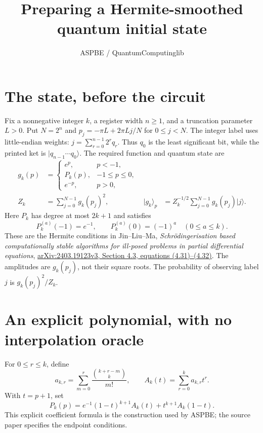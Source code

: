 \documentclass[11pt]{article}
\title{Preparing a Hermite-smoothed quantum initial state}
\author{ASPBE / QuantumComputinglib}
\date{}
\newcommand{\ket}[1]{\lvert #1\rangle}
\begin{document}
\maketitle

\section{The state, before the circuit}
Fix a nonnegative integer $k$, a register width $n\geq1$, and a truncation
parameter $L>0$. Put $N=2^n$ and $p_j=-\pi L+2\pi Lj/N$ for $0\leq j<N$.
The integer label uses little-endian weights:
$j=\sum_{r=0}^{n-1}2^rq_r$. Thus $q_0$ is the least significant bit,
while the printed ket is $\ket{q_{n-1}\cdots q_0}$.
The required function and quantum state are
\begin{align*}
g_k(p)&=\begin{cases}
 e^p,&p<-1,\\
 P_k(p),&-1\leq p\leq0,\\
 e^{-p},&p>0,
\end{cases}\\
Z_k&=\sum_{j=0}^{N-1}g_k(p_j)^2,
&\ket{g_k}_p&=Z_k^{-1/2}\sum_{j=0}^{N-1}g_k(p_j)\ket j.
\end{align*}
Here $P_k$ has degree at most $2k+1$ and satisfies
\[
P_k^{(a)}(-1)=e^{-1},\qquad P_k^{(a)}(0)=(-1)^a
\quad(0\leq a\leq k).
\]
These are the Hermite conditions in Jin--Liu--Ma,
\emph{Schr\"odingerisation based computationally stable algorithms for
ill-posed problems in partial differential equations},
\href{https://arxiv.org/html/2403.19123v3#S4.SS3}{arXiv:2403.19123v3,
Section 4.3, equations (4.31)--(4.32)}.
The amplitudes are $g_k(p_j)$, not their square roots. The probability of
observing label $j$ is $g_k(p_j)^2/Z_k$.

\section{An explicit polynomial, with no interpolation oracle}
For $0\leq r\leq k$, define
\[
a_{k,r}=\sum_{m=0}^{r}\frac{\binom{k+r-m}{k}}{m!},
\qquad A_k(t)=\sum_{r=0}^{k}a_{k,r}t^r.
\]
With $t=p+1$, set
\[
P_k(p)=e^{-1}(1-t)^{k+1}A_k(t)+t^{k+1}A_k(1-t).
\]
This explicit coefficient formula is the construction used by ASPBE; the
source paper specifies the endpoint conditions.
\end{document}
